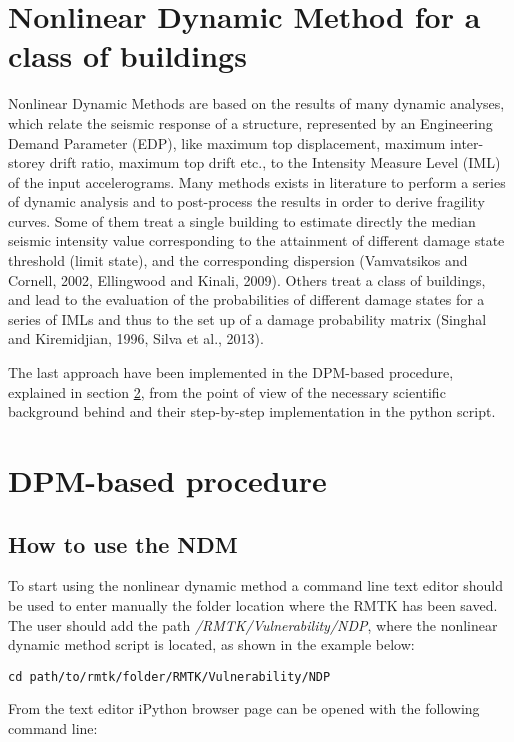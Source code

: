 \section{Nonlinear Dynamic Method for a class of buildings}
Nonlinear Dynamic Methods are based on the results of many dynamic analyses, which relate the seismic response of a structure, represented by an Engineering Demand Parameter (EDP), like maximum top displacement, maximum inter-storey drift ratio, maximum top drift etc., to the Intensity Measure Level (IML) of the input accelerograms. 
Many methods exists in literature to perform a series of dynamic analysis and to post-process the results in order to derive fragility curves. Some of them treat a single building to estimate directly the median seismic intensity value corresponding to the attainment of different damage state threshold (limit state), and the corresponding dispersion (Vamvatsikos and Cornell, 2002, Ellingwood and Kinali, 2009). Others treat a class of buildings, and lead to the evaluation of the probabilities of different damage states for a series of IMLs and thus to the set up of a damage probability matrix (Singhal and Kiremidjian, 1996, Silva et al., 2013).

The last approach have been implemented in the DPM-based procedure, explained in section \ref{sec:DPM}, from the point of view of the necessary scientific background behind and their step-by-step implementation in the python script.

\section{DPM-based procedure}
\label{sec:DPM}
\subsection{How to use the NDM}
To start using the nonlinear dynamic method a command line text editor should be used to enter manually the folder location where the RMTK has been saved. The user should add the path \textit{/RMTK/Vulnerability/NDP}, where the nonlinear dynamic method script is located, as shown in the example below:

\begin{Verbatim}[frame=single, commandchars=\\\{\}, samepage=true]
cd path/to/rmtk/folder/RMTK/Vulnerability/NDP
\end{Verbatim}

From the text editor iPython browser page can be opened with the following command line:

